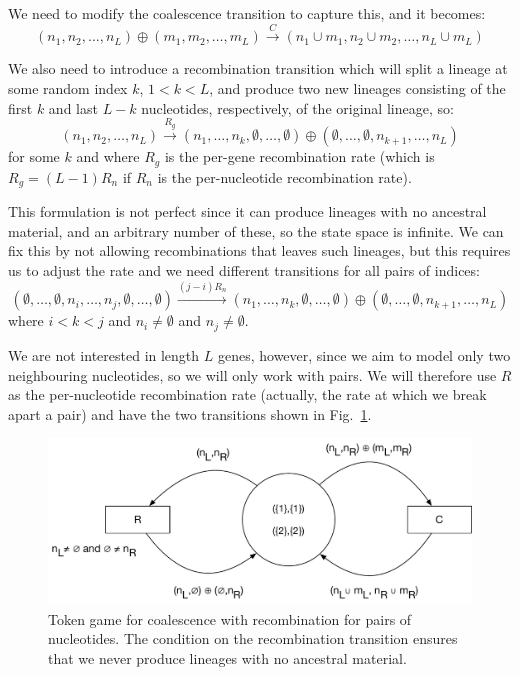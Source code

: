 \documentclass[graybox]{svmult}
\newcommand{\trans}[3]{\ensuremath{#1 \xrightarrow{#2} #3}}
\begin{document}
We need to modify the coalescence transition to capture this, and it becomes:
\begin{equation}
\trans{(n_1,n_2,\ldots,n_L) \oplus (m_1,m_2,\ldots,m_L)}{C}{(n_1\cup m_1,n_2\cup m_2,\ldots, n_L \cup m_L)}
\end{equation}

We also need to introduce a recombination transition which will split a lineage at some random index $k$, $1<k<L$, and produce two new lineages consisting of the first $k$ and last $L-k$ nucleotides, respectively, of the original lineage, so:
\begin{equation}
\trans{(n_1,n_2,\ldots,n_L)}{R_g}{(n_1,\ldots,n_k,\emptyset,\ldots,\emptyset)\oplus(\emptyset,\ldots,\emptyset,n_{k+1},\ldots,n_L)}
\end{equation}
for some $k$ and where $R_g$ is the per-gene recombination rate (which is $R_g=(L-1)R_n$ if $R_n$ is the per-nucleotide recombination rate).

This formulation is not perfect since it can produce lineages with no ancestral material, and an arbitrary number of these, so the state space is infinite. We can fix this by not allowing recombinations that leaves such lineages, but this requires us to adjust the rate and we need different transitions for all pairs of indices:
\begin{equation}
\trans{(\emptyset,\ldots,\emptyset,n_i,\ldots,n_j,\emptyset,\ldots,\emptyset)}{(j-i)R_n}{(n_1,\ldots,n_k,\emptyset,\ldots,\emptyset)\oplus(\emptyset,\ldots,\emptyset,n_{k+1},\ldots,n_L)}
\end{equation}
where $i<k<j$ and $n_i\neq\emptyset$ and $n_j\neq\emptyset$.

We are not interested in length $L$ genes, however, since we aim to model only two neighbouring nucleotides, so we will only work with pairs. We will therefore use $R$ as the per-nucleotide recombination rate (actually, the rate at which we break apart a pair) and have the two transitions shown in Fig.~\ref{fig:coalescence-recombination-CPN}.

\begin{figure}[h]
\sidecaption
\includegraphics[scale=.30]{figures/coalescence-recombination-CPN}
\caption{Token game for coalescence with recombination for pairs of nucleotides. The condition on the recombination transition ensures that we never produce lineages with no ancestral material.}
\label{fig:coalescence-recombination-CPN}
\end{figure}
\end{document}
